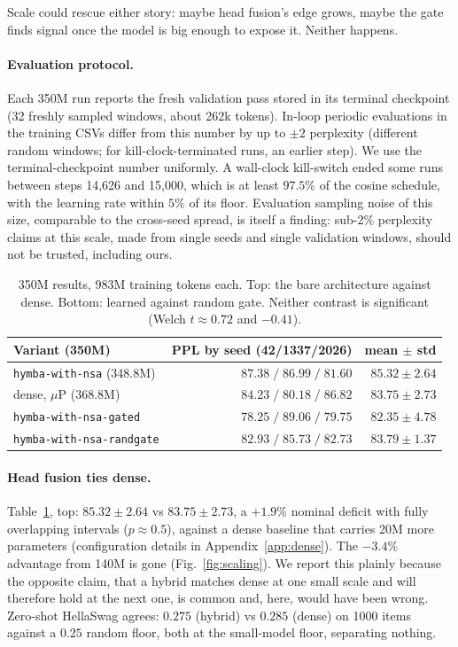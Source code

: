 \documentclass[11pt,a4paper]{article}
\begin{document}
Scale could rescue either story: maybe head fusion's edge grows, maybe
the gate finds signal once the model is big enough to expose it. Neither
happens.

\paragraph{Evaluation protocol.} Each 350M run reports the fresh
validation pass stored in its terminal checkpoint (32 freshly sampled
windows, about 262k tokens). In-loop periodic evaluations in the training
CSVs differ from this number by up to $\pm 2$ perplexity (different
random windows; for kill-clock-terminated runs, an earlier step). We use
the terminal-checkpoint number uniformly. A wall-clock kill-switch ended
some runs between steps 14{,}626 and 15{,}000, which is at least
$97.5\%$ of the cosine schedule, with the learning rate within $5\%$ of
its floor. Evaluation sampling noise of this size, comparable to the
cross-seed spread, is itself a finding: sub-2\% perplexity claims at this
scale, made from single seeds and single validation windows, should not
be trusted, including ours.

\begin{table}[t]
\centering
\begin{tabular}{lrr}
\toprule
Variant (350M) & PPL by seed (42/1337/2026) & mean $\pm$ std \\
\midrule
\texttt{hymba-with-nsa} (348.8M) & $87.38\;/\;86.99\;/\;81.60$ & $85.32 \pm 2.64$ \\
dense, $\mu$P (368.8M) & $84.23\;/\;80.18\;/\;86.82$ & $83.75 \pm 2.73$ \\
\midrule
\texttt{hymba-with-nsa-gated} & $78.25\;/\;89.06\;/\;79.75$ & $82.35 \pm 4.78$ \\
\texttt{hymba-with-nsa-randgate} & $82.93\;/\;85.73\;/\;82.73$ & $83.79 \pm 1.37$ \\
\bottomrule
\end{tabular}
\caption{350M results, 983M training tokens each. Top: the bare
architecture against dense. Bottom: learned against random gate. Neither
contrast is significant (Welch $t \approx 0.72$ and $-0.41$).}
\label{tab:350m}
\end{table}

\paragraph{Head fusion ties dense.} Table~\ref{tab:350m}, top:
$85.32 \pm 2.64$ vs $83.75 \pm 2.73$, a $+1.9\%$ nominal deficit with
fully overlapping intervals ($p \approx 0.5$), against a dense baseline
that carries 20M more parameters (configuration details in
Appendix~\ref{app:dense}). The $-3.4\%$ advantage from 140M is
gone (Fig.~\ref{fig:scaling}). We report this plainly because the
opposite claim, that a hybrid matches dense at one small scale and will
therefore hold at the next one, is common and, here, would have been
wrong. Zero-shot HellaSwag agrees: $0.275$ (hybrid) vs $0.285$ (dense)
on 1000 items against a $0.25$ random floor, both at the small-model
floor, separating nothing.
\end{document}
